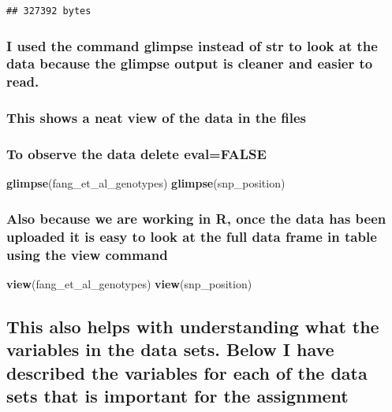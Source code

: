 \documentclass[
]{article}
\newenvironment{Shaded}{\begin{snugshade}}{\end{snugshade}}
\newcommand{\FunctionTok}[1]{\textcolor[rgb]{0.13,0.29,0.53}{\textbf{#1}}}
\newcommand{\NormalTok}[1]{#1}
\begin{document}
\begin{verbatim}
## 327392 bytes
\end{verbatim}

\subsubsection{I used the command glimpse instead of str to look at the
data because the glimpse output is cleaner and easier to
read.}\label{i-used-the-command-glimpse-instead-of-str-to-look-at-the-data-because-the-glimpse-output-is-cleaner-and-easier-to-read.}

\subsubsection{This shows a neat view of the data in the
files}\label{this-shows-a-neat-view-of-the-data-in-the-files}

\subsubsection{\texorpdfstring{\textbf{To observe the data delete
eval=FALSE}}{To observe the data delete eval=FALSE}}\label{to-observe-the-data-delete-evalfalse}

\begin{Shaded}
\begin{Highlighting}[]
\FunctionTok{glimpse}\NormalTok{(fang\_et\_al\_genotypes)}
\FunctionTok{glimpse}\NormalTok{(snp\_position)}
\end{Highlighting}
\end{Shaded}

\subsubsection{Also because we are working in R, once the data has been
uploaded it is easy to look at the full data frame in table using the
view
command}\label{also-because-we-are-working-in-r-once-the-data-has-been-uploaded-it-is-easy-to-look-at-the-full-data-frame-in-table-using-the-view-command}

\begin{Shaded}
\begin{Highlighting}[]
\FunctionTok{view}\NormalTok{(fang\_et\_al\_genotypes)}
\FunctionTok{view}\NormalTok{(snp\_position)}
\end{Highlighting}
\end{Shaded}

\subsection{This also helps with understanding what the variables in the
data sets. Below I have described the variables for each of the data
sets that is important for the
assignment}\label{this-also-helps-with-understanding-what-the-variables-in-the-data-sets.-below-i-have-described-the-variables-for-each-of-the-data-sets-that-is-important-for-the-assignment}
\end{document}
